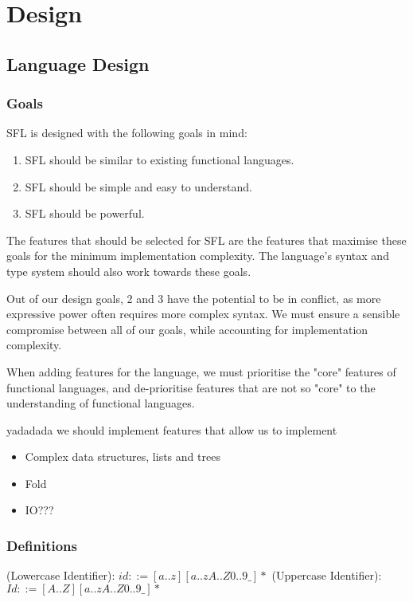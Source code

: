\chapter{Design}
\label{chap:design}

\section{Language Design}
\subsection{Goals}
\label{design:goals}
SFL is designed with the following goals in mind:
\begin{enumerate}
    \item SFL should be similar to existing functional languages.
    \item SFL should be simple and easy to understand. 
    \item SFL should be powerful.
\end{enumerate}
The features that should be selected for SFL are the features that maximise these goals for the minimum implementation complexity. The language's syntax and type system should also work towards these goals. 

Out of our design goals, 2 and 3 have the potential to be in conflict, as more expressive power often requires more complex syntax. We must ensure a sensible compromise between all of our goals, while accounting for implementation complexity. 

When adding features for the language, we must prioritise the "core" features of functional languages, and de-prioritise features that are not so "core" to the understanding of functional languages. 

yadadada we should implement features that allow us to implement
\begin{itemize}
    \item Complex data structures, lists and trees
    \item Fold
    \item IO???
\end{itemize}

\subsection{Definitions}

\begin{syntax}
\label{def:identifier_syntax}
(Lowercase Identifier): \(id ::= [a..z][a..zA..Z0..9\_]*\)\newline
(Uppercase Identifier): \(Id ::= [A..Z][a..zA..Z0..9\_]*\)
\end{syntax}


